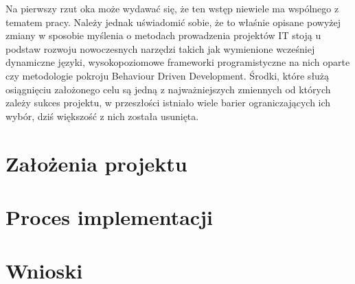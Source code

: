   Na pierwszy rzut oka może wydawać się, że ten wstęp niewiele ma wspólnego z tematem pracy. Należy jednak uświadomić sobie, że to właśnie opisane powyżej zmiany w sposobie myślenia o metodach prowadzenia projektów IT stoją u podstaw rozwoju nowoczesnych narzędzi takich jak wymienione wcześniej dynamiczne języki, wysokopoziomowe frameworki programistyczne na nich oparte czy metodologie pokroju Behaviour Driven Development. Środki, które służą osiągnięciu założonego celu są jedną z najważniejszych zmiennych od których zależy sukces projektu, w przeszłości istniało wiele barier ograniczających ich wybór, dziś większość z nich została usunięta.
  
  \section{Założenia projektu}
  
  
  \section{Proces implementacji}
  \section{Wnioski}

